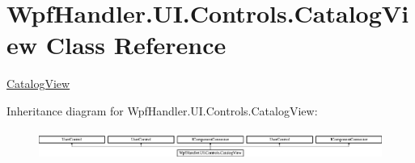 \hypertarget{class_wpf_handler_1_1_u_i_1_1_controls_1_1_catalog_view}{}\section{Wpf\+Handler.\+U\+I.\+Controls.\+Catalog\+View Class Reference}
\label{class_wpf_handler_1_1_u_i_1_1_controls_1_1_catalog_view}


\mbox{\hyperlink{class_wpf_handler_1_1_u_i_1_1_controls_1_1_catalog_view}{Catalog\+View}}  


Inheritance diagram for Wpf\+Handler.\+U\+I.\+Controls.\+Catalog\+View\+:\begin{figure}[H]
\begin{center}
\leavevmode
\includegraphics[height=0.982456cm]{dc/db6/class_wpf_handler_1_1_u_i_1_1_controls_1_1_catalog_view}
\end{center}
\end{figure}
